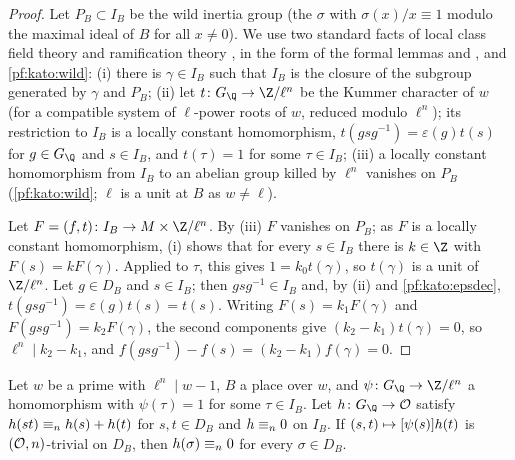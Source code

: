 \begin{proof}
Let $P_B\subset I_B$ be the wild inertia group (the $\sigma$ with $\sigma(x)/x\equiv1$ modulo the maximal ideal of $B$ for all
$x\ne0$). We use two standard facts of local class field theory and ramification theory \cite[Ch.~IV]{Serre1979}, in the
form of the formal lemmas  and
, and \cref{pf:kato:wild}:
(i) there is $\gamma\in I_B$ such that $I_B$ is the closure of the subgroup generated by $\gamma$ and $P_B$;
(ii) let $t\colon G_\Q\to\Z/\ell^n$ be the Kummer character of $w$ (for a compatible system of $\ell$-power roots of $w$,
reduced modulo $\ell^n$); its restriction to $I_B$ is a locally constant homomorphism, $t(gsg^{-1})=\varepsilon(g)t(s)$ for
$g\in G_\Q$ and $s\in I_B$, and $t(\tau)=1$ for some $\tau\in I_B$;
(iii) a locally constant homomorphism from $I_B$ to an abelian group killed by $\ell^n$ vanishes on $P_B$ (\cref{pf:kato:wild};
$\ell$ is a unit at $B$ as $w\ne\ell$).

Let $F=(f,t)\colon I_B\to M\times\Z/\ell^n$. By (iii) $F$ vanishes on $P_B$; as $F$ is a locally constant homomorphism,
(i) shows that for every $s\in I_B$ there is $k\in\Z$ with $F(s)=kF(\gamma)$. Applied to $\tau$, this gives $1=k_0t(\gamma)$,
so $t(\gamma)$ is a unit of $\Z/\ell^n$. Let $g\in D_B$ and $s\in I_B$; then $gsg^{-1}\in I_B$ and, by (ii) and
\cref{pf:kato:epsdec}, $t(gsg^{-1})=\varepsilon(g)t(s)=t(s)$. Writing $F(s)=k_1F(\gamma)$ and $F(gsg^{-1})=k_2F(\gamma)$, the
second components give $(k_2-k_1)t(\gamma)=0$, so $\ell^n\mid k_2-k_1$, and $f(gsg^{-1})-f(s)=(k_2-k_1)f(\gamma)=0$.
\end{proof}

\begin{lemma}\label{pf:kato:brtame}
Let $w$ be a prime with $\ell^n\mid w-1$, $B$ a place over $w$, and $\psi\colon G_\Q\to\Z/\ell^n$ a homomorphism with
$\psi(\tau)=1$ for some $\tau\in I_B$. Let $h\colon G_\Q\to\katoO$ satisfy $h(st)\equiv_{n}h(s)+h(t)$ for $s,t\in D_B$ and
$h\equiv_{n}0$ on $I_B$. If $(s,t)\mapsto[\psi(s)]h(t)$ is $(\mathcal{O},n)$-trivial on $D_B$, then $h(\sigma)\equiv_{n}0$ for every
$\sigma\in D_B$.
\end{lemma}

